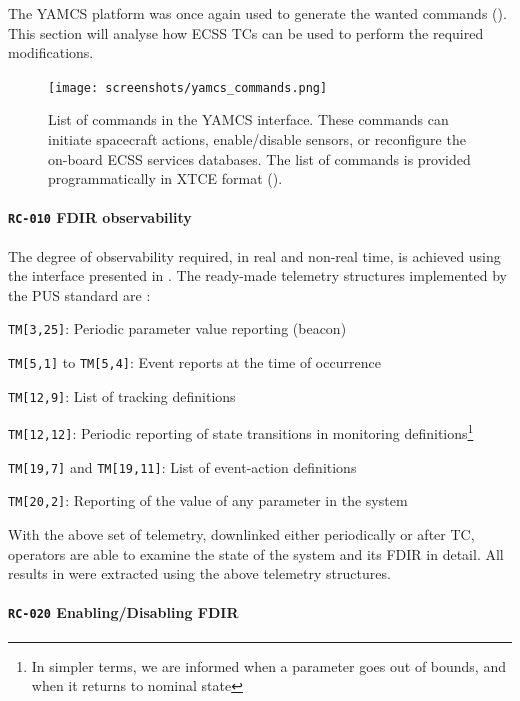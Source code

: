 \documentclass[a4paper,nobib]{tufte-book}
\begin{document}
The \ac{YAMCS} platform was once again used to generate the wanted commands (). This section will analyse how \acs{ECSS} \acsp{TC} can be used to perform the required modifications.

\begin{figure}[h]
	\texttt{[image: screenshots/yamcs\_commands.png]}
	\caption{List of commands in the \acs{YAMCS} interface. These commands can initiate spacecraft actions, enable/disable sensors, or reconfigure the on-board \acs{ECSS} services databases. The list of commands is provided programmatically in \ac{XTCE} format ().}
	\label{fig:yamcs_commands}
\end{figure}


\paragraph{\textbf{\texttt{RC-010} \acs{FDIR} observability}}
The degree of observability required, in real and non-real time, is achieved using the interface presented in . The ready-made telemetry structures implemented by the \acs{PUS} standard are \autocite{ECSS-E-ST-70-41C}:
\begin{compactitem}
	\item \texttt{TM[3,25]}: Periodic parameter value reporting (beacon)
	\item \texttt{TM[5,1]} to \texttt{TM[5,4]}: Event reports at the time of occurrence
	\item \texttt{TM[12,9]}: List of tracking definitions
	\item \texttt{TM[12,12]}: Periodic reporting of state transitions in monitoring definitions\footnote{In simpler terms, we are informed when a parameter goes out of bounds, and when it returns to nominal state}
	\item \texttt{TM[19,7]} and \texttt{TM[19,11]}: List of event-action definitions
	\item \texttt{TM[20,2]}: Reporting of the value of any parameter in the system
\end{compactitem}

With the above set of telemetry, downlinked either periodically or after \acs{TC}, operators are able to examine the state of the system and its \acs{FDIR} in detail. All results in  were extracted using the above telemetry structures.

\paragraph{\textbf{\texttt{RC-020} Enabling/Disabling \acs{FDIR}}}
\end{document}
